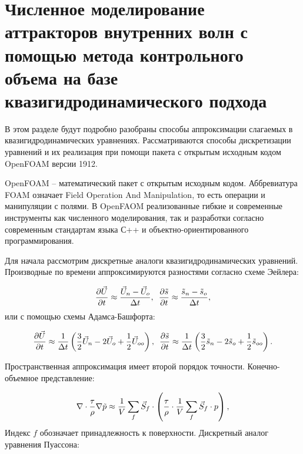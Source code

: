 \section{Численное моделирование аттракторов внутренних волн с помощью метода контрольного объема на базе квазигидродинамического подхода}

В этом разделе будут подробно разобраны способы аппроксимации слагаемых в квазигидродинамических уравнениях. Рассматриваются способы дискретизации уравнений и их реализация при помощи пакета с открытым исходным кодом OpenFOAM версии 1912\cite{OpenFOAM}.

OpenFOAM -- математический пакет с открытым исходным кодом. Аббревиатура FOAM означает Field Operation And Manipulation, то есть операции и манипуляции с полями. В OpenFAOM реализованные гибкие и современные инструменты как численного моделирования, так и разработки согласно современным стандартам языка С++ и объектно-ориентированного программирования. 

Для начала рассмотрим дискретные аналоги квазигидродинамических уравнений. Производные по времени аппроксимируются разностями согласно схеме Эейлера:

\begin{equation}
    \frac{\partial \vec{U}}{\partial t} \approx \frac{ \vec{U}_n-\vec{U}_o}{\Delta t}, \,\,\,
    \frac{\partial \Tilde{s}}{\partial t} \approx \frac{ \Tilde{s}_n-\Tilde{s}_o}{\Delta t},
\end{equation}
или с помощью схемы Адамса-Башфорта:

\begin{equation}
    \frac{\partial \vec{U}}{\partial t} \approx   \frac{1}{\Delta t} \left  (\frac{3}{2}\vec{U}_n - 2\vec{U}_o + \frac{1}{2} \vec{U}_{oo} \right), \,\,\,
    \frac{\partial \Tilde{s}}{\partial t} \approx \frac{1}{\Delta t} \left (\frac{3}{2}\Tilde{s}_n - 2\Tilde{s}_o + \frac{1}{2} \Tilde{s}_{oo}\right).
\end{equation}

Пространственная аппроксимация имеет второй порядок точности. Конечно-объемное представление:

\begin{equation}
        \nabla \cdot \frac{\tau}{\rho}\nabla \Tilde{p} \approx  \frac{1}{V} \sum_f \vec{S}_f \cdot \left(   \frac{\tau}{\rho} \cdot \frac{1}{V} \sum_f \vec{S}_f \cdot p  \right) ,
\end{equation}
Индекс $f$ обозначает принадлежность к поверхности.
Дискретный аналог уравнения Пуассона:

